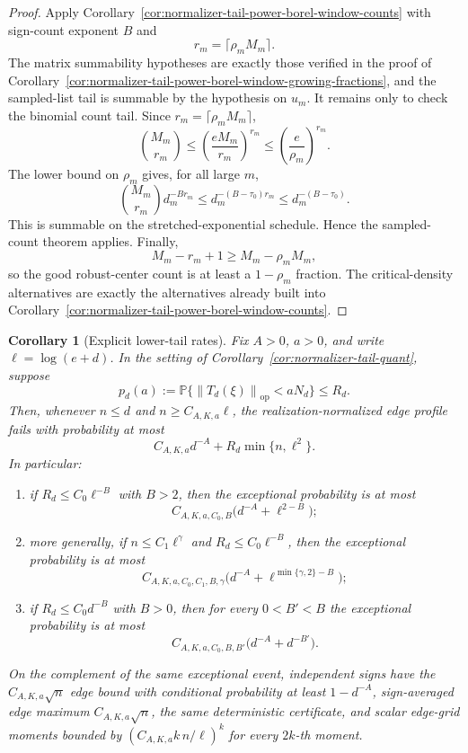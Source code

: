 \documentclass[11pt]{amsart}
\numberwithin{equation}{section}
\newtheorem{corollary}[theorem]{Corollary}
\theoremstyle{definition}
\theoremstyle{remark}
\newcommand{\op}{\mathrm{op}}
\newcommand{\Prob}{\mathbb P}
\newcommand{\norm}[1]{\left\lVert #1\right\rVert}
\begin{document}
\begin{proof}
Apply Corollary~\ref{cor:normalizer-tail-power-borel-window-counts} with
sign-count exponent \(B\) and
\[
  r_m=\lceil\rho_mM_m\rceil .
\]
The matrix summability hypotheses are exactly those verified in the proof of
Corollary~\ref{cor:normalizer-tail-power-borel-window-growing-fractions}, and
the sampled-list tail is summable by the hypothesis on \(u_m\).  It remains only
to check the binomial count tail.  Since \(r_m=\lceil\rho_mM_m\rceil\),
\[
  \binom{M_m}{r_m}
  \le \left(\frac{eM_m}{r_m}\right)^{r_m}
  \le \left(\frac e{\rho_m}\right)^{r_m}.
\]
The lower bound on \(\rho_m\) gives, for all large \(m\),
\[
  \binom{M_m}{r_m}d_m^{-B r_m}
  \le d_m^{-(B-\tau_0)r_m}\le d_m^{-(B-\tau_0)}.
\]
This is summable on the stretched-exponential schedule.  Hence the sampled-count
theorem applies.  Finally,
\[
  M_m-r_m+1\ge M_m-\rho_mM_m,
\]
so the good robust-center count is at least a \(1-\rho_m\) fraction.  The
critical-density alternatives are exactly the alternatives already built into
Corollary~\ref{cor:normalizer-tail-power-borel-window-counts}.
\end{proof}

\begin{corollary}[Explicit lower-tail rates]
\label{cor:normalizer-tail-rates}
Fix \(A>0\), \(a>0\), and write \(\ell=\log(e+d)\).
In the setting of Corollary~\ref{cor:normalizer-tail-quant}, suppose
\[
  p_d(a):=\Prob\{\norm{T_d(\xi)}_{\op}<aN_d\}\le R_d .
\]
Then, whenever \(n\le d\) and \(n\ge C_{A,K,a}\ell\), the realization-normalized
edge profile fails with probability at most
\[
  C_{A,K,a}d^{-A}+R_d\min\{n,\ell^2\}.
\]
In particular:
\begin{enumerate}[label=\textup{(\roman*)}]
\item if \(R_d\le C_0\ell^{-B}\) with \(B>2\), then the exceptional probability
is at most
\[
  C_{A,K,a,C_0,B}\bigl(d^{-A}+\ell^{2-B}\bigr);
\]
\item more generally, if \(n\le C_1\ell^\gamma\) and
\(R_d\le C_0\ell^{-B}\), then the exceptional probability is at most
\[
  C_{A,K,a,C_0,C_1,B,\gamma}
  \bigl(d^{-A}+\ell^{\min\{\gamma,2\}-B}\bigr);
\]
\item if \(R_d\le C_0d^{-B}\) with \(B>0\), then for every \(0<B'<B\)
the exceptional probability is at most
\[
  C_{A,K,a,C_0,B,B'}\bigl(d^{-A}+d^{-B'}\bigr).
\]
\end{enumerate}
On the complement of the same exceptional event, independent signs have the
\(C_{A,K,a}\sqrt n\) edge bound with conditional probability at least
\(1-d^{-A}\), sign-averaged edge maximum \(C_{A,K,a}\sqrt n\), the same
deterministic certificate, and scalar edge-grid moments bounded by
\((C_{A,K,a}k\,n/\ell)^k\) for every \(2k\)-th moment.
\end{corollary}
\end{document}

